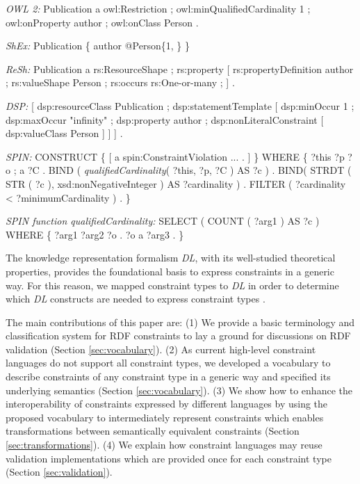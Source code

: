 \documentclass[a4paper,fontsize=11pt]{scrartcl}
\begin{document}
\begin{ex}[commandchars=\\\{\}]
\textit{OWL 2:} Publication a owl:Restriction ;
          owl:minQualifiedCardinality 1 ;
          owl:onProperty author ;
          owl:onClass Person .
		
\textit{ShEx:} Publication \{ author @Person\{1, \} \}

\textit{ReSh:} Publication a rs:ResourceShape ; rs:property [
          rs:propertyDefinition author ;
          rs:valueShape Person ;
          rs:occurs rs:One-or-many ; ] .
		
\textit{DSP:} [ dsp:resourceClass Publication ; dsp:statementTemplate [ 
          dsp:minOccur 1 ; dsp:maxOccur "infinity" ; 
          dsp:property author ; 
          dsp:nonLiteralConstraint [ dsp:valueClass Person ] ] ] .
					
\textit{SPIN:} CONSTRUCT \{ [ a spin:ConstraintViolation ... . ] \} WHERE \{ 
          ?this ?p ?o ; a ?C .
          BIND ( \textit{qualifiedCardinality}( ?this, ?p, ?C ) AS ?c ) .
          BIND( STRDT ( STR ( ?c ), xsd:nonNegativeInteger ) AS ?cardinality ) .
          FILTER ( ?cardinality < ?minimumCardinality ) . \}
						
\textit{SPIN function qualifiedCardinality:}										
SELECT ( COUNT ( ?arg1 ) AS ?c ) WHERE \{ ?arg1 ?arg2 ?o . ?o a ?arg3 . \}
\end{ex}

The knowledge representation formalism {\em DL}, with its  well-studied theoretical properties, provides the foundational basis to express constraints in a generic way. 
For this reason, we mapped constraint types to \emph{DL} 
in order to determine which \emph{DL} constructs are needed to express constraint types \cite{BoschNolleAcarEckert2015}.

The main contributions of this paper are:
(1) We provide a basic terminology and classification system for RDF constraints to lay a ground for discussions on RDF validation (Section \ref{sec:vocabulary}).
(2) As current high-level constraint languages do not support all constraint types, 
we developed a vocabulary to describe constraints of any constraint type in a generic way and specified its underlying semantics (Section \ref{sec:vocabulary}).
(3) We show how to enhance the interoperability of constraints expressed by different languages by using the proposed vocabulary 
to intermediately represent constraints 
which enables transformations between semantically equivalent constraints (Section \ref{sec:transformations}).
(4) We explain how constraint languages may reuse validation implementations which are provided once for each constraint type (Section \ref{sec:validation}).
\end{document}
